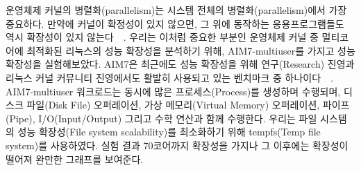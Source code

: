 운영체제 커널의 병렬화(parallelism)는 시스템 전체의 병렬화(parallelism)에서 가장 중요하다. 
만약에 커널이 확정성이 있지 않으면, 그 위에 동작하는 응용프로그램들도 역시 확장성이 있지
 않는다~\cite{Clements15SCR}~\cite{Boyd-WickizerCorey}.
우리는 이처럼 중요한 부분인 운영체제 커널 중 멀티코어에 최적화된 리눅스의 성능 확장성을 분석하기 위해, 
AIM7-multiuser를 가지고 성능 확장성을 실험해보았다.
AIM7은 최근에도 성능 확장성을 위해 연구(Research) 진영과 리눅스 커널 커뮤니티 진영에서도 활발히
 사용되고 있는 벤치마크 중 하나이다~\cite{Bueso2015STP}~\cite{Bueso2014MCS}.
AIM7-multiuser 워크로드는 동시에 많은 프로세스(Process)를 생성하며 수행되며, 디스크 파일(Disk File) 오퍼레이션,
 가상 메모리(Virtual Memory) 오퍼레이션, 파이프(Pipe), I/O(Input/Output) 그리고 수학 연산과 함께 수행한다.
우리는 파일 시스템의 성능 확장성(File system scalability)를 최소화하기 위해 
tempfs(Temp file system)를 사용하였다.
실험 결과 70코어까지 확장성을 가지나 그 이후에는 확장성이 떨어져 완만한 그래프를 보여준다. 



